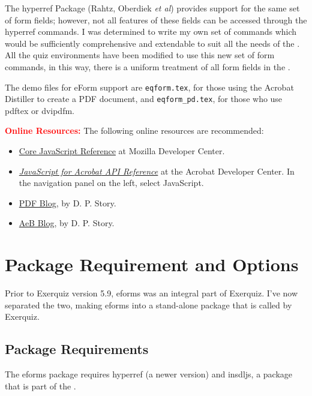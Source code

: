 \documentclass{article}
\let\pkg\textsf
\let\app\textsf
\def\eForm{\textsf{eForm}}
\begin{document}
The \pkg{hyperref} Package (Rahtz, Oberdiek \textit{et al})
provides support for the same set of form fields; however, not all
features of these fields can be accessed through the
\pkg{hyperref} commands.  I was determined to write my own set
of commands which would be sufficiently comprehensive and
extendable to suit all the needs of the \cAcroB.  All the quiz
environments have been modified to use this new set of form
commands, in this way, there is a uniform treatment of all form
fields in the \cAcroB.

\redpoint The demo files for {\eForm} support are
\texttt{eqform.tex}, for those using the \textsf{\app{Acrobat}
Distiller} to create a PDF document, and \texttt{eqform\_pd.tex},
for those who use \textsf{pdftex} or \textsf{dvipdfm}.

\newtopic\textbf{\textcolor{red}{Online Resources:}} The following online
resources are recommended:
\begin{itemize}
  \item \href{https://developer.mozilla.org/en/JavaScript}{Core JavaScript Reference} at
  Mozilla Developer Center.
  \item \href{http://livedocs.adobe.com/acrobat_sdk/9/Acrobat9_HTMLHelp/wwhelp/wwhimpl/js/html/wwhelp.htm?&accessible=true}
  {\emph{JavaScript for \app{Acrobat} API Reference}} at the \app{Acrobat} Developer Center. In the navigation panel
  on the left, select JavaScript.
  \item \href{\urlAcroTeXBlog/?cat=5}{PDF Blog},
  by D. P. Story.
  \item \href{\urlAcroTeXBlog/?cat=24}{AeB Blog},
  by D. P. Story.
\end{itemize}

\section{Package Requirement and Options}

Prior to \textsf{Exerquiz} version 5.9, \textsf{eforms} was
an integral part of \textsf{Exerquiz}. I've now separated the two, making
\textsf{eforms} into a stand-alone package that is called by
\textsf{Exerquiz}.

\subsection{Package Requirements}

The \textsf{eforms} package requires \pkg{hyperref} (a newer version)
and \textsf{insdljs}, a package that is part of the {\cAcroB}.
\end{document}
